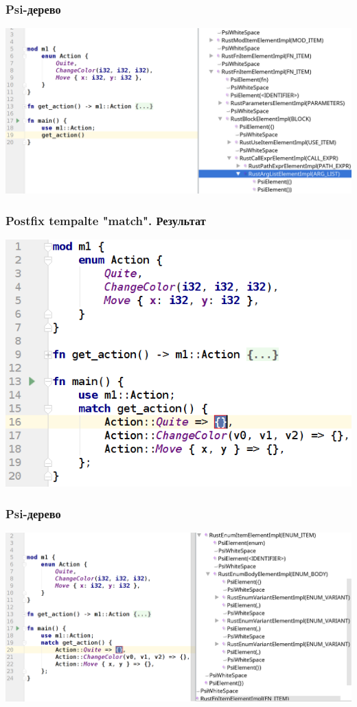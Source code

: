 \documentclass[10pt,pdf,hyperref={unicode}]{beamer}
\begin{document}
\begin{frame}
    \frametitle{Psi-дерево} 
	\includegraphics[scale = 0.3]{psi1.png}
\end{frame}

\begin{frame}
	\frametitle{Postfix tempalte "match". Результат} 
	\includegraphics[scale = 0.6]{match_after.png}
\end{frame}

\begin{frame}
	\frametitle{Psi-дерево} 
	\includegraphics[scale = 0.3]{psi2.png}
\end{frame}
\end{document}
